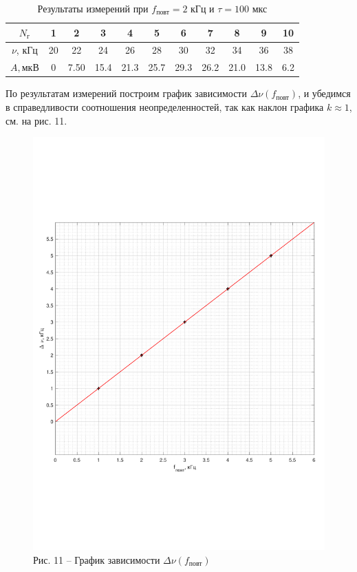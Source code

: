 \documentclass[a4paper,14pt]{article}
\begin{document}

\begin{table}[hbt!]
	\begin{center}
	\begin{tabular}{|c|c|c|c|c|c|c|c|c|c|c|} \hline
		$N_{\text{г}}$&1&	2&	3&4&	5&	6&	7&8&	9 & 	10\\ \hline
		$\nu$, кГц	&20&	22&	24	&26	&28&	30&	32&	34&	36&	38 \\ \hline
			$A, \text{мкВ}$&0	&7.50&	15.4&	21.3&	25.7&	29.3&	26.2&	21.0&	13.8&	6.2\\ \hline
	\end{tabular}
\caption{Результаты измерений при $f_\text{повт} = 2$ кГц  и $\tau = 100$ мкс}
\label{tab6}
\end{center}
\end{table}

По результатам измерений построим график зависимости $\Delta \nu(f_{\text{повт}})$, и убедимся в справедливости соотношения неопределенностей, так как наклон графика $k \approx 1$, см. на рис. 11.

\begin{center}
	\begin{figure}[hbt!]
		\centering
		\includegraphics[width=0.7\linewidth]{gr2.pdf} \\
		Рис. 11 -- График зависимости $\Delta \nu(f_{\text{повт}})$
		\label{gr2}
	\end{figure}
\end{center}
\end{document}
